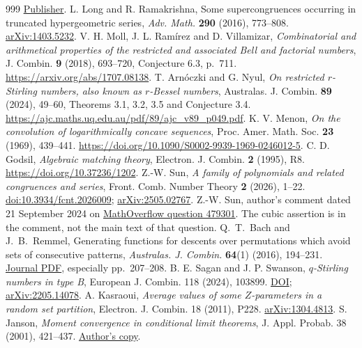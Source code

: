 \documentclass[11pt,a4paper]{article}
\begin{document}
\begin{thebibliography}{999}
\href{https://doi.org/10.1007/s00025-023-01885-8}{Publisher}.
L. Long and R. Ramakrishna, Some supercongruences occurring in
truncated hypergeometric series, \emph{Adv. Math.} \textbf{290}
(2016), 773--808. \href{https://arxiv.org/abs/1403.5232}{arXiv:1403.5232}.
V. H. Moll, J. L. Ram\'{i}rez and D. Villamizar,
\emph{Combinatorial and arithmetical properties of the restricted and associated
Bell and factorial numbers}, J. Combin. \textbf{9} (2018), 693--720,
Conjecture 6.3, p.~711. \url{https://arxiv.org/abs/1707.08138}.
T. Arn\'{o}czki and G. Nyul,
\emph{On restricted $r$-Stirling numbers, also known as $r$-Bessel numbers},
Australas. J. Combin. \textbf{89} (2024), 49--60,
Theorems 3.1, 3.2, 3.5 and Conjecture 3.4.
\url{https://ajc.maths.uq.edu.au/pdf/89/ajc_v89_p049.pdf}.
K. V. Menon,
\emph{On the convolution of logarithmically concave sequences},
Proc. Amer. Math. Soc. \textbf{23} (1969), 439--441.
\url{https://doi.org/10.1090/S0002-9939-1969-0246012-5}.
C. D. Godsil,
\emph{Algebraic matching theory}, Electron. J. Combin.
\textbf{2} (1995), R8. \url{https://doi.org/10.37236/1202}.
Z.-W. Sun, \emph{A family of polynomials and related congruences and
series}, Front. Comb. Number Theory \textbf{2} (2026), 1--22.
\href{https://doi.org/10.3934/fcnt.2026009}{doi:10.3934/fcnt.2026009};
\href{https://arxiv.org/abs/2505.02767}{arXiv:2505.02767}.
Z.-W. Sun, author's comment dated 21 September 2024 on
\href{https://mathoverflow.net/questions/479301/on-the-polynomials-sum-k-0n-binomnkkm-qk}
{MathOverflow question 479301}. The cubic assertion is in the comment,
not the main text of that question.
Q.~T.~Bach and J.~B.~Remmel, Generating functions for descents over permutations which avoid sets of consecutive patterns, \emph{Australas. J. Combin.} \textbf{64}(1) (2016), 194--231. \href{https://ajc.maths.uq.edu.au/pdf/64/ajc_v64_p194.pdf}{Journal PDF}, especially pp.~207--208.
B. E. Sagan and J. P. Swanson, \emph{$q$-Stirling numbers in type B}, European J. Combin. 118 (2024), 103899. \href{https://doi.org/10.1016/j.ejc.2023.103899}{DOI}; \href{https://arxiv.org/abs/2205.14078}{arXiv:2205.14078}.
A. Kasraoui, \emph{Average values of some $Z$-parameters in a random set partition}, Electron. J. Combin. 18 (2011), P228. \href{https://arxiv.org/abs/1304.4813}{arXiv:1304.4813}.
S. Janson, \emph{Moment convergence in conditional limit theorems}, J. Appl. Probab. 38 (2001), 421--437. \href{https://www2.math.uu.se/~svantejs/papers/sj132.pdf}{Author's copy}.

\end{thebibliography}
\end{document}
